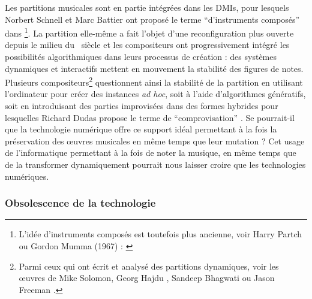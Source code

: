 \noindent Les partitions musicales sont en partie intégrées dans les \glspl{DMI}, pour lesquels Norbert Schnell et Marc Battier ont proposé le terme ``d'instruments composés'' dans \cite{schnell_introducing_2002}\footnote{L'idée d'instruments composés est toutefois plus ancienne, voir Harry Partch ou Gordon Mumma (1967) : \cite{mumma_creative_1967}}. La partition elle-même a fait l'objet d'une reconfiguration plus ouverte depuis le milieu du ~siècle et les compositeurs ont progressivement intégré les possibilités algorithmiques dans leurs processus de création : des systèmes dynamiques et interactifs mettent en mouvement la stabilité des figures de notes. Plusieurs compositeurs\footnote{Parmi ceux qui ont écrit et analysé des partitions dynamiques, voir les œuvres de Mike Solomon, Georg Hajdu \cite{hajdu_disposable_2016}, Sandeep Bhagwati \cite{bhagwati_vexations_2017} ou Jason Freeman \cite{freeman_extreme_2008}.} questionnent ainsi la stabilité de la partition en utilisant l'ordinateur pour créer des instances \textit{ad hoc}, soit à l'aide d'algorithmes génératifs, soit en introduisant des parties improvisées dans des formes hybrides pour lesquelles Richard Dudas propose le terme de ``comprovisation'' \cite{dudas_comprovisation:_2010}. Se pourrait-il que la technologie numérique offre ce support idéal permettant à la fois la préservation des œuvres musicales en même temps que leur mutation ? 
Cet usage de l'informatique permettant à la fois de noter la musique, en même temps que de la transformer dynamiquement pourrait nous laisser croire que les technologies numériques.

\subsubsection{Obsolescence de la technologie}

